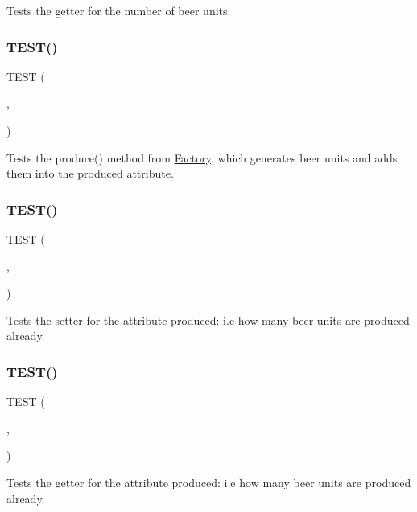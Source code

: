 Tests the getter for the number of beer units. \mbox{\label{group__group2_gad5f9adbefad0030a7a205362bc7caf61}} 
\subsubsection{\texorpdfstring{T\+E\+S\+T()}{TEST()}\hspace{0.1cm}{\footnotesize\ttfamily [52/54]}}
{\footnotesize\ttfamily T\+E\+ST (\begin{DoxyParamCaption}\item[{factory\+Test}]{,  }\item[{produce\+Test}]{ }\end{DoxyParamCaption})}

Tests the produce() method from \hyperlink{classFactory}{Factory}, which generates beer units and adds them into the produced attribute. \mbox{\label{group__group2_gae393c27ace3356d6d073f20d39c105d7}} 
\subsubsection{\texorpdfstring{T\+E\+S\+T()}{TEST()}\hspace{0.1cm}{\footnotesize\ttfamily [53/54]}}
{\footnotesize\ttfamily T\+E\+ST (\begin{DoxyParamCaption}\item[{factory\+Test}]{,  }\item[{set\+Produced\+Test}]{ }\end{DoxyParamCaption})}

Tests the setter for the attribute produced\+: i.\+e how many beer units are produced already. \mbox{\label{group__group2_ga043b3bbddca3d76940b04e53d2af6628}} 
\subsubsection{\texorpdfstring{T\+E\+S\+T()}{TEST()}\hspace{0.1cm}{\footnotesize\ttfamily [54/54]}}
{\footnotesize\ttfamily T\+E\+ST (\begin{DoxyParamCaption}\item[{factory\+Test}]{,  }\item[{get\+Produced\+Test}]{ }\end{DoxyParamCaption})}

Tests the getter for the attribute produced\+: i.\+e how many beer units are produced already. 